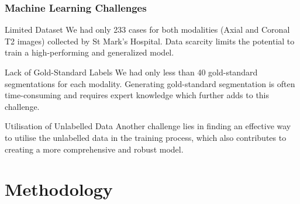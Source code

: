 \documentclass{beamer}
\begin{document}

\begin{frame}
\frametitle{Machine Learning Challenges}
\begin{block}{Limited Dataset}
We had only 233 cases for both modalities (Axial and Coronal T2 images) collected by St Mark's Hospital. Data scarcity limits the potential to train a high-performing and generalized model.
\end{block}

\begin{block}{Lack of Gold-Standard Labels}
We had only less than 40 gold-standard segmentations for each modality. Generating gold-standard segmentation is often time-consuming and requires expert knowledge which further adds to this challenge.
\end{block}

\begin{block}{Utilisation of Unlabelled Data}
Another challenge lies in finding an effective way to utilise the unlabelled data in the training process, which also contributes to creating a more comprehensive and robust model.
\end{block}
\end{frame}

\section{Methodology}
\end{document}
